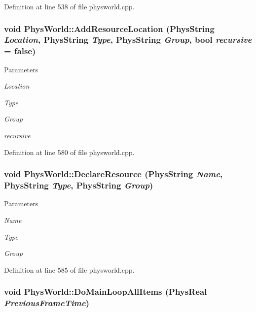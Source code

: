 Definition at line 538 of file physworld.cpp.\hypertarget{classPhysWorld_a757783fa596bda8ebdbc24234c6b621a}{
\subsubsection[{AddResourceLocation}]{\setlength{\rightskip}{0pt plus 5cm}void PhysWorld::AddResourceLocation (PhysString {\em Location}, \/  PhysString {\em Type}, \/  PhysString {\em Group}, \/  bool {\em recursive} = {\ttfamily false})}}
\label{db/df5/classPhysWorld_a757783fa596bda8ebdbc24234c6b621a}

\begin{DoxyParams}{Parameters}
\item[{\em Location}]\item[{\em Type}]\item[{\em Group}]\item[{\em recursive}]\end{DoxyParams}


Definition at line 580 of file physworld.cpp.\hypertarget{classPhysWorld_a908c21f7f5452f8d7c6d4b5b2308ba5e}{
\subsubsection[{DeclareResource}]{\setlength{\rightskip}{0pt plus 5cm}void PhysWorld::DeclareResource (PhysString {\em Name}, \/  PhysString {\em Type}, \/  PhysString {\em Group})}}
\label{db/df5/classPhysWorld_a908c21f7f5452f8d7c6d4b5b2308ba5e}

\begin{DoxyParams}{Parameters}
\item[{\em Name}]\item[{\em Type}]\item[{\em Group}]\end{DoxyParams}


Definition at line 585 of file physworld.cpp.\hypertarget{classPhysWorld_a174da29a119080c44ba628cb25918f8c}{
\subsubsection[{DoMainLoopAllItems}]{\setlength{\rightskip}{0pt plus 5cm}void PhysWorld::DoMainLoopAllItems (PhysReal {\em PreviousFrameTime})}}
\label{db/df5/classPhysWorld_a174da29a119080c44ba628cb25918f8c}


